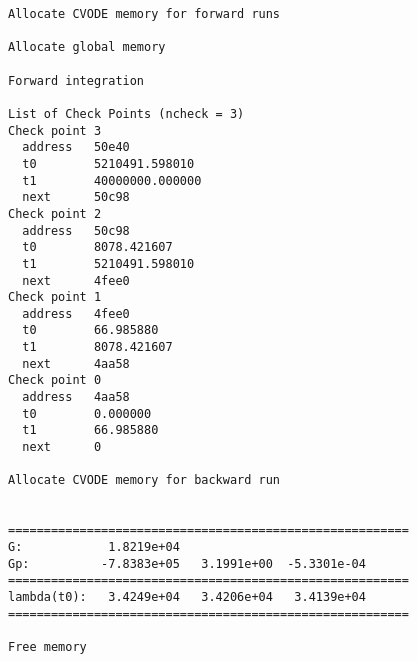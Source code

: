 \begin{verbatim}
Allocate CVODE memory for forward runs

Allocate global memory

Forward integration

List of Check Points (ncheck = 3)
Check point 3
  address   50e40
  t0        5210491.598010
  t1        40000000.000000
  next      50c98
Check point 2
  address   50c98
  t0        8078.421607
  t1        5210491.598010
  next      4fee0
Check point 1
  address   4fee0
  t0        66.985880
  t1        8078.421607
  next      4aa58
Check point 0
  address   4aa58
  t0        0.000000
  t1        66.985880
  next      0

Allocate CVODE memory for backward run


========================================================
G:            1.8219e+04 
Gp:          -7.8383e+05   3.1991e+00  -5.3301e-04
========================================================
lambda(t0):   3.4249e+04   3.4206e+04   3.4139e+04
========================================================

Free memory
\end{verbatim}